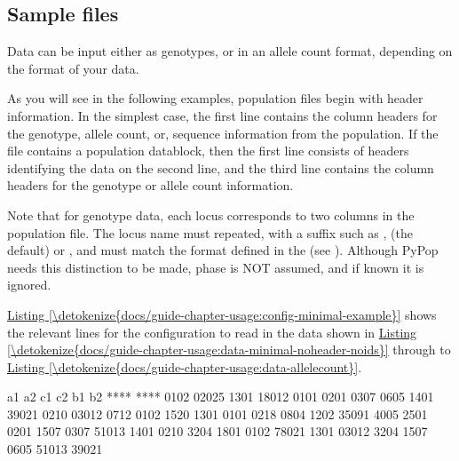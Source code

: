 \documentclass[letterpaper,10pt,english,openany,oneside]{sphinxmanual}
\begin{document}
\subsection{Sample files}
\label{\detokenize{docs/guide-chapter-usage:sample-files}}
\sphinxAtStartPar
Data can be input either as genotypes, or in an allele count format,
depending on the format of your data.

\sphinxAtStartPar
As you will see in the following examples, population files begin with
header information. In the simplest case, the first line contains the
column headers for the genotype, allele count, or, sequence information
from the population. If the file contains a population data\sphinxhyphen{}block, then
the first line consists of headers identifying the data on the second
line, and the third line contains the column headers for the genotype or
allele count information.

\sphinxAtStartPar
Note that for genotype data, each locus corresponds to two columns in
the population file. The locus name must repeated, with a suffix such as
,  (the default) or ,  and must match the format
defined in the  (see
{\hyperref[\detokenize{docs/guide-chapter-usage:validsamplefields}]{}}). Although PyPop needs this
distinction to be made, phase is NOT assumed, and if known it is
ignored.

\sphinxAtStartPar
\hyperref[\detokenize{docs/guide-chapter-usage:config-minimal-example}]{Listing \ref{\detokenize{docs/guide-chapter-usage:config-minimal-example}}} shows the relevant lines for the
configuration to read in the data shown in
\hyperref[\detokenize{docs/guide-chapter-usage:data-minimal-noheader-noids}]{Listing \ref{\detokenize{docs/guide-chapter-usage:data-minimal-noheader-noids}}} through to \hyperref[\detokenize{docs/guide-chapter-usage:data-allelecount}]{Listing \ref{\detokenize{docs/guide-chapter-usage:data-allelecount}}}.
\def\sphinxLiteralBlockLabel{\label{\detokenize{docs/guide-chapter-usage:data-minimal-noheader-noids}}}
\begin{sphinxVerbatim}[commandchars=\\\{\}]
a\PYGZus{}1   a\PYGZus{}2   c\PYGZus{}1   c\PYGZus{}2   b\PYGZus{}1   b\PYGZus{}2
****  ****  0102  02025 1301  18012
0101  0201  0307  0605  1401  39021
0210  03012 0712  0102  1520  1301
0101  0218  0804  1202  35091 4005
2501  0201  1507  0307  51013 1401
0210  3204  1801  0102  78021 1301
03012 3204  1507  0605  51013 39021
\end{sphinxVerbatim}
\end{document}
